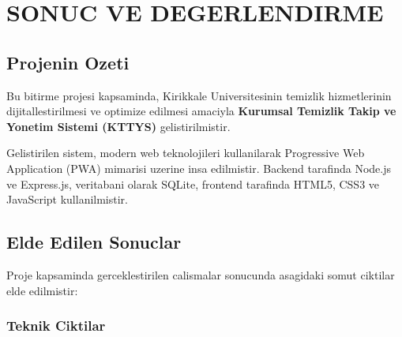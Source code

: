 
\chapter{SONUC VE DEGERLENDIRME}
\label{chap:sonuc}

\section{Projenin Ozeti}
\label{sec:proje-ozeti}

Bu bitirme projesi kapsaminda, Kirikkale Universitesinin temizlik 
hizmetlerinin dijitallestirilmesi ve optimize edilmesi amaciyla 
\textbf{Kurumsal Temizlik Takip ve Yonetim Sistemi (KTTYS)} 
gelistirilmistir.

Gelistirilen sistem, modern web teknolojileri kullanilarak 
Progressive Web Application (PWA) mimarisi uzerine insa edilmistir. 
Backend tarafinda Node.js ve Express.js, veritabani olarak SQLite, 
frontend tarafinda HTML5, CSS3 ve JavaScript kullanilmistir.

\section{Elde Edilen Sonuclar}
\label{sec:elde-edilen-sonuclar}

Proje kapsaminda gerceklestirilen calismalar sonucunda asagidaki 
somut ciktilar elde edilmistir:

\subsection{Teknik Ciktilar}
\label{subsec:teknik-ciktilar}

